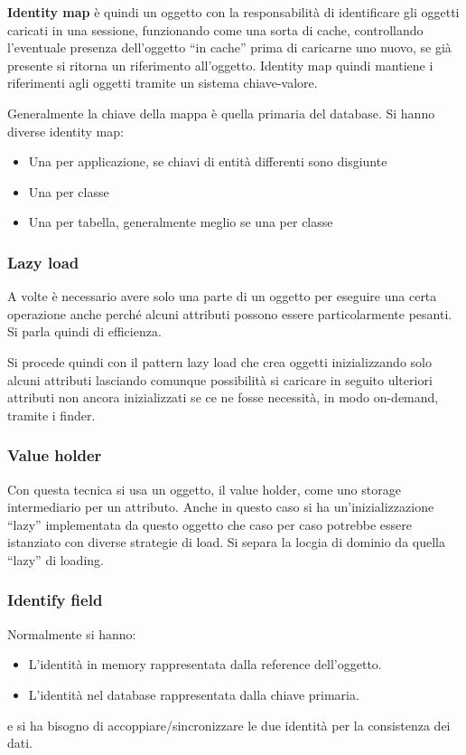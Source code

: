 \textbf{Identity map} è quindi un oggetto con la responsabilità di identificare gli oggetti caricati in una sessione, funzionando come una sorta di cache, controllando l'eventuale presenza dell'oggetto “in cache” prima di caricarne uno nuovo, se già presente si ritorna un riferimento
all'oggetto. Identity map quindi mantiene i riferimenti agli oggetti tramite un sistema chiave-valore.

Generalmente la chiave della mappa è quella primaria del database. Si hanno diverse identity map:
\begin{itemize}
    \item Una per applicazione, se chiavi di entità differenti sono disgiunte
    \item Una per classe
    \item Una per tabella, generalmente meglio se una per classe
\end{itemize}
\subsubsection{Lazy load}
A volte è necessario avere solo una parte di un oggetto per eseguire una certa operazione anche perché alcuni attributi possono essere particolarmente pesanti. Si parla quindi di efficienza.

Si procede quindi con il pattern lazy load che crea oggetti inizializzando solo alcuni attributi lasciando comunque possibilità si caricare in seguito ulteriori attributi non ancora inizializzati se ce ne fosse necessità, in modo on-demand, tramite i finder.
\subsubsection{Value holder}
Con questa tecnica si usa un oggetto, il value holder, come uno storage intermediario per un attributo. Anche in questo caso si ha un'inizializzazione “lazy” implementata da questo oggetto che caso per caso potrebbe essere istanziato con diverse strategie di load. Si separa la locgia di dominio da quella “lazy” di loading.
\subsubsection{Identify field}
Normalmente si hanno:
\begin{itemize}
    \item L'identità in memory rappresentata dalla reference dell'oggetto.
    \item L'identità nel database rappresentata dalla chiave primaria.
\end{itemize}
e si ha bisogno di accoppiare/sincronizzare le due identità per la consistenza dei dati.

